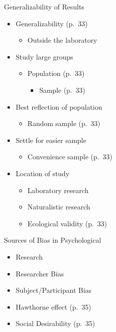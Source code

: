 \documentclass[
]{book}
\providecommand{\tightlist}{%
  \setlength{\itemsep}{0pt}\setlength{\parskip}{0pt}}
\begin{document}
Generalizability of Results

\begin{itemize}
\tightlist
\item
  Generalizability (p.~33)

  \begin{itemize}
  \tightlist
  \item
    Outside the laboratory\\
  \end{itemize}
\item
  Study large groups

  \begin{itemize}
  \tightlist
  \item
    Population (p.~33)

    \begin{itemize}
    \tightlist
    \item
      Sample (p.~33)\\
    \end{itemize}
  \end{itemize}
\item
  Best reflection of population

  \begin{itemize}
  \tightlist
  \item
    Random sample (p.~33)\\
  \end{itemize}
\item
  Settle for easier sample

  \begin{itemize}
  \tightlist
  \item
    Convenience sample (p.~33)\\
  \end{itemize}
\item
  Location of study

  \begin{itemize}
  \tightlist
  \item
    Laboratory research\\
  \item
    Naturalistic research\\
  \item
    Ecological validity (p.~33)
  \end{itemize}
\end{itemize}

Sources of Bias in Psychological

\begin{itemize}
\tightlist
\item
  Research\\
\item
  Researcher Bias\\
\item
  Subject/Participant Bias\\
\item
  Hawthorne effect (p.~35)\\
\item
  Social Desirability (p.~35)
\end{itemize}
\end{document}
